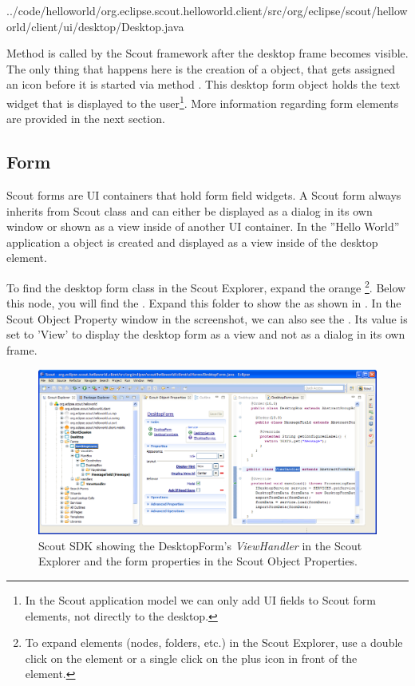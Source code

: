 \documentclass[a4paper,10pt,twoside]{book}
\begin{document}

{../code/helloworld/org.eclipse.scout.helloworld.client/src/org/eclipse/scout/helloworld/client/ui/desktop/Desktop.java}

Method  is called by the Scout framework after the desktop frame becomes visible.
The only thing that happens here is the creation of a  object, that gets assigned an icon before it is started via method .
This desktop form object holds the  text widget that is displayed to the user\footnote{
In the Scout application model we can only add UI fields to Scout form elements, not directly to the desktop.
}.
More information regarding form elements are provided in the next section.

\subsection{Form}

Scout forms are UI containers that hold form field widgets.
A Scout form always inherits from Scout class  and can either be displayed as a dialog in its own window or shown as a view inside of another UI container.
In the ''Hello World'' application a  object is created and displayed as a view inside of the desktop element.

To find the desktop form class in the Scout Explorer, expand the orange \footnote{
To expand elements (nodes, folders, etc.) in the Scout Explorer, use a double click on the element or a single click on the plus icon in front of the element.}.
Below this node, you will find the . 
Expand this folder to show the  as shown in .
In the Scout Object Property window in the screenshot, we can also see the .
Its value is set to 'View' to display the desktop form as a view and not as a dialog in its own frame.

\begin{figure}
\includegraphics[width=15cm]{sdk_helloworld_viewhandler.png}
\caption{Scout SDK showing the DesktopForm's \textit{ViewHandler} in the Scout Explorer and the form properties in the Scout Object Properties.}
\end{figure}
\end{document}
